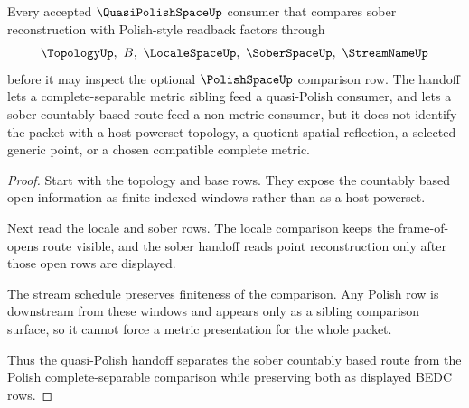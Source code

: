 \begin{theorem}
\label{thm:quasi-polish-space-sober-polish-handoff}
Every accepted $\QuasiPolishSpaceUp$ consumer that compares sober reconstruction with Polish-style readback factors through
$$
\TopologyUp,\ B,\ \LocaleSpaceUp,\ \SoberSpaceUp,\ \StreamNameUp
$$
before it may inspect the optional $\PolishSpaceUp$ comparison row. The handoff lets a complete-separable metric sibling feed a quasi-Polish consumer, and lets a sober countably based route feed a non-metric consumer, but it does not identify the packet with a host powerset topology, a quotient spatial reflection, a selected generic point, or a chosen compatible complete metric.
\end{theorem}
\begin{proof}
Start with the topology and base rows. They expose the countably based open information as finite indexed windows rather than as a host powerset.

Next read the locale and sober rows. The locale comparison keeps the frame-of-opens route visible, and the sober handoff reads point reconstruction only after those open rows are displayed.

The stream schedule preserves finiteness of the comparison. Any Polish row is downstream from these windows and appears only as a sibling comparison surface, so it cannot force a metric presentation for the whole packet.

Thus the quasi-Polish handoff separates the sober countably based route from the Polish complete-separable comparison while preserving both as displayed BEDC rows.
\end{proof}




